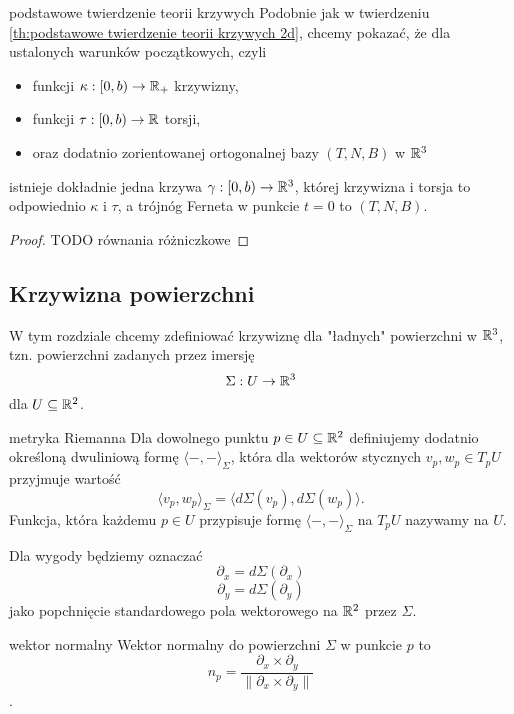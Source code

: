 \begin{theorem}{podstawowe twierdzenie teorii krzywych}{}
  Podobnie jak w twierdzeniu \ref{th:podstawowe twierdzenie teorii krzywych 2d}, chcemy pokazać, że dla ustalonych warunków początkowych, czyli 
  \begin{itemize}
    \item funkcji $\kappa:[0,b)\to\mathbb{R}_+$ krzywizny,
    \item funkcji $\tau:[0,b)\to \mathbb{R}$ torsji, 
    \item oraz dodatnio zorientowanej ortogonalnej bazy $(T,N,B)$ w $\mathbb{R}^3$
  \end{itemize}
  istnieje dokładnie jedna krzywa $\gamma:[0,b)\to\mathbb{R}^3$, której krzywizna i torsja to odpowiednio $\kappa$ i $\tau$, a trójnóg Ferneta w punkcie $t=0$ to $(T,N,B)$.
\end{theorem}

\begin{proof}TODO równania różniczkowe
\end{proof}

\subsection{Krzywizna powierzchni}

W tym rozdziale chcemy zdefiniować krzywiznę dla "ładnych" powierzchni w $\mathbb{R}^3$, tzn. powierzchni zadanych przez imersję
$$\Sigma:U\to \mathbb{R}^3$$
dla $U\subseteq\mathbb{R}^2$.

\begin{definition}{metryka Riemanna}{}
  Dla dowolnego punktu $p\in U\subseteq\mathbb{R}^2$ definiujemy dodatnio określoną dwuliniową formę $\langle-,-\rangle_\Sigma$, która dla wektorów stycznych $v_p,w_p\in T_pU$ przyjmuje wartość
  $$\langle v_p, w_p\rangle_\Sigma=\langle d\Sigma(v_p), d\Sigma(w_p)\rangle.$$
  Funkcja, która każdemu $p\in U$ przypisuje formę $\langle-,-\rangle_\Sigma$ na $T_pU$ nazywamy  na $U$.
\end{definition}

Dla wygody będziemy oznaczać
$$\partial_x=d\Sigma(\partial_x)$$
$$\partial_y=d\Sigma(\partial_y)$$
jako popchnięcie standardowego pola wektorowego na $\mathbb{R}^2$ przez $\Sigma$.

\begin{definition}{wektor normalny}{}
  Wektor normalny do powierzchni $\Sigma$ w punkcie $p$ to 
  $$n_p=\frac{\partial_x\times\partial_y}{\|\partial_x\times\partial_y\|}$$.
\end{definition}

